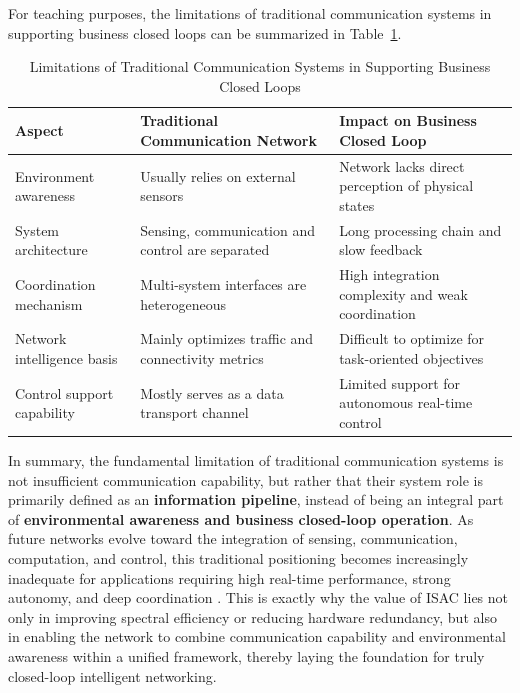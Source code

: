 For teaching purposes, the limitations of traditional communication systems in supporting business closed loops can be summarized in Table~\ref{tab:traditional-network-closed-loop-limitations}.
\begin{table}[htbp]
\centering
\caption{Limitations of Traditional Communication Systems in Supporting Business Closed Loops}
\label{tab:traditional-network-closed-loop-limitations}
\begin{tabular}{p{3.6cm}p{4.8cm}p{4.8cm}}
\hline
\textbf{Aspect} & \textbf{Traditional Communication Network} & \textbf{Impact on Business Closed Loop} \\
\hline
Environment awareness & Usually relies on external sensors & Network lacks direct perception of physical states \\
System architecture & Sensing, communication and control are separated & Long processing chain and slow feedback \\
Coordination mechanism & Multi-system interfaces are heterogeneous & High integration complexity and weak coordination \\
Network intelligence basis & Mainly optimizes traffic and connectivity metrics & Difficult to optimize for task-oriented objectives \\
Control support capability & Mostly serves as a data transport channel & Limited support for autonomous real-time control \\
\hline
\end{tabular}
\end{table}

In summary, the fundamental limitation of traditional communication systems is not insufficient communication capability, but rather that their system role is primarily defined as an \textbf{information pipeline}, instead of being an integral part of \textbf{environmental awareness and business closed-loop operation}. As future networks evolve toward the integration of sensing, communication, computation, and control, this traditional positioning becomes increasingly inadequate for applications requiring high real-time performance, strong autonomy, and deep coordination \cite{Liu2022ISAC, ITU2030, Saad2020Vision6G}. This is exactly why the value of ISAC lies not only in improving spectral efficiency or reducing hardware redundancy, but also in enabling the network to combine communication capability and environmental awareness within a unified framework, thereby laying the foundation for truly closed-loop intelligent networking.

